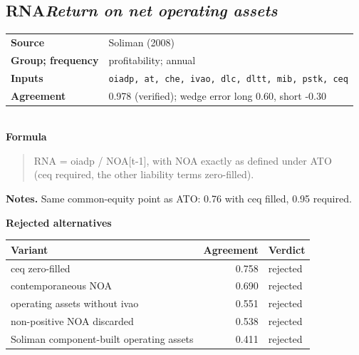 \documentclass[11pt]{article}
\begin{document}
\subsection*{RNA\quad\normalfont\itshape Return on net operating assets}
\begin{tabular}{@{}p{3.3cm}p{12.3cm}@{}}
\textbf{Source} & Soliman (2008)\\
\textbf{Group; frequency} & profitability; annual\\
\textbf{Inputs} & \texttt{oiadp, at, che, ivao, dlc, dltt, mib, pstk, ceq}\\
\textbf{Agreement} & 0.978 (verified); wedge error long 0.60, short -0.30\\
\end{tabular}\\[4pt]
\textbf{Formula}
\begin{quote}\small
RNA = oiadp / NOA[t-1], with NOA exactly as defined under ATO\\
(ceq required, the other liability terms zero-filled).\\

\end{quote}
\textbf{Notes.} Same common-equity point as ATO: 0.76 with ceq filled, 0.95 required.


\textbf{Rejected alternatives}\\[2pt]
{\small\begin{longtable}{@{}p{9.6cm}rp{4.3cm}@{}}
\toprule Variant & Agreement & Verdict\\\midrule\endhead
ceq zero-filled & 0.758 & rejected\\
contemporaneous NOA & 0.690 & rejected\\
operating assets without ivao & 0.551 & rejected\\
non-positive NOA discarded & 0.538 & rejected\\
Soliman component-built operating assets & 0.411 & rejected\\
\bottomrule\end{longtable}}
\end{document}
